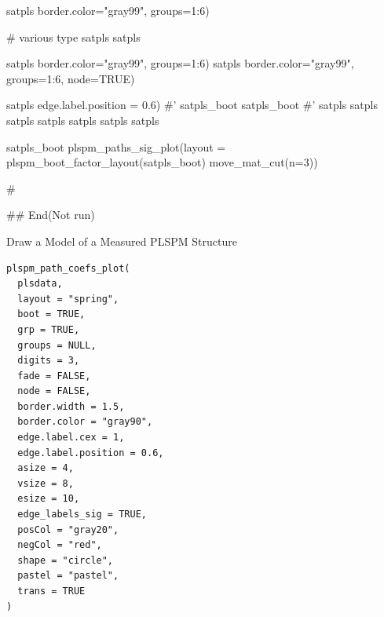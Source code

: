\documentclass[a4paper]{book}
\begin{document}
\begin{Examples}
\begin{ExampleCode}
satpls %
                            border.color="gray99", groups=1:6)


# various type
satpls %
satpls %

satpls %
                                 border.color="gray99", groups=1:6)
satpls %
                                 border.color="gray99", groups=1:6, node=TRUE)

satpls %
                                 edge.label.position = 0.6)
#'
satpls_boot%
satpls_boot%
#'
satpls %
satpls %
satpls %
satpls %
satpls %
satpls %
satpls %

satpls_boot %
plspm_paths_sig_plot(layout =  plspm_boot_factor_layout(satpls_boot)%
 move_mat_cut(n=3))

\#



## End(Not run)
\end{ExampleCode}
\end{Examples}
%
\begin{Description}
Draw a Model of a Measured PLSPM Structure
\end{Description}
%
\begin{Usage}
\begin{verbatim}
plspm_path_coefs_plot(
  plsdata,
  layout = "spring",
  boot = TRUE,
  grp = TRUE,
  groups = NULL,
  digits = 3,
  fade = FALSE,
  node = FALSE,
  border.width = 1.5,
  border.color = "gray90",
  edge.label.cex = 1,
  edge.label.position = 0.6,
  asize = 4,
  vsize = 8,
  esize = 10,
  edge_labels_sig = TRUE,
  posCol = "gray20",
  negCol = "red",
  shape = "circle",
  pastel = "pastel",
  trans = TRUE
)
\end{verbatim}
\end{Usage}
%
\end{document}
